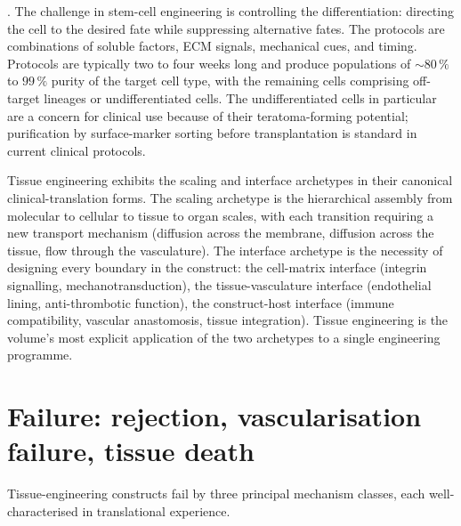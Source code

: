 . The challenge in stem-cell engineering
is controlling the differentiation: directing the cell to the desired
fate while suppressing alternative fates. The protocols are
combinations of soluble factors, ECM signals, mechanical cues, and
timing. Protocols are typically two to four weeks long and produce
populations of $\sim 80\,\%$ to $99\,\%$ purity of the target cell
type, with the remaining cells comprising off-target lineages or
undifferentiated cells. The undifferentiated cells in particular are
a concern for clinical use because of their teratoma-forming
potential; purification by surface-marker sorting before
transplantation is standard in current clinical protocols.

\begin{archetype}
Tissue engineering exhibits the scaling and interface archetypes in
their canonical clinical-translation forms. The scaling archetype is
the hierarchical assembly from molecular to cellular to tissue to
organ scales, with each transition requiring a new transport
mechanism (diffusion across the membrane, diffusion across the tissue,
flow through the vasculature). The interface archetype is the
necessity of designing every boundary in the construct: the
cell-matrix interface (integrin signalling, mechanotransduction), the
tissue-vasculature interface (endothelial lining, anti-thrombotic
function), the construct-host interface (immune compatibility,
vascular anastomosis, tissue integration). Tissue engineering is the
volume's most explicit application of the two archetypes to a single
engineering programme.
\end{archetype}

\section{Failure: rejection, vascularisation failure, tissue death}

Tissue-engineering constructs fail by three principal mechanism
classes, each well-characterised in translational experience.

